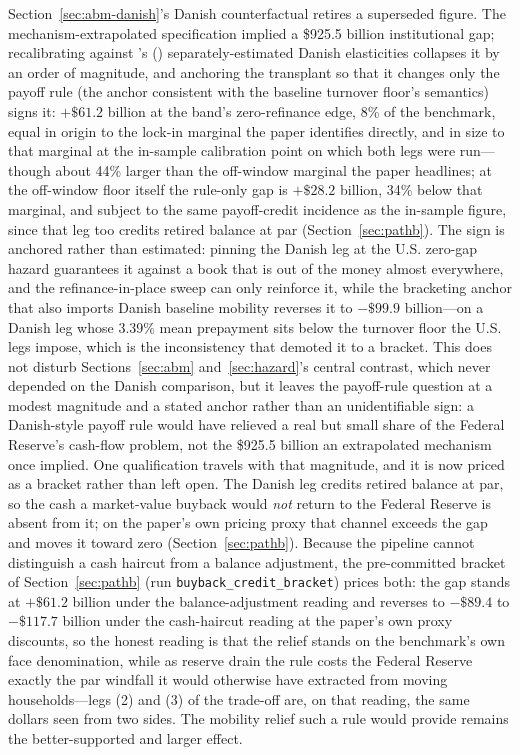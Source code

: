 \documentclass[12pt]{article}
\newcommand{\citepos}[1]{\citeauthor{#1}'s (\citeyear{#1})}
\begin{document}
Section~\ref{sec:abm-danish}'s Danish counterfactual retires a superseded figure. The mechanism-extrapolated specification implied a \$925.5 billion institutional gap; recalibrating against \citepos{berger2026} separately-estimated Danish elasticities collapses it by an order of magnitude, and anchoring the transplant so that it changes only the payoff rule (the anchor consistent with the baseline turnover floor's semantics) signs it: $+\$61.2$ billion at the band's zero-refinance edge, 8\% of the benchmark, equal in origin to the lock-in marginal the paper identifies directly, and in size to that marginal at the in-sample calibration point on which both legs were run---though about 44\% larger than the off-window marginal the paper headlines; at the off-window floor itself the rule-only gap is $+\$28.2$ billion, 34\% below that marginal, and subject to the same payoff-credit incidence as the in-sample figure, since that leg too credits retired balance at par (Section~\ref{sec:pathb}). The sign is anchored rather than estimated: pinning the Danish leg at the U.S. zero-gap hazard guarantees it against a book that is out of the money almost everywhere, and the refinance-in-place sweep can only reinforce it, while the bracketing anchor that also imports Danish baseline mobility reverses it to $-\$99.9$ billion---on a Danish leg whose 3.39\% mean prepayment sits below the turnover floor the U.S. legs impose, which is the inconsistency that demoted it to a bracket. This does not disturb Sections~\ref{sec:abm} and~\ref{sec:hazard}'s central contrast, which never depended on the Danish comparison, but it leaves the payoff-rule question at a modest magnitude and a stated anchor rather than an unidentifiable sign: a Danish-style payoff rule would have relieved a real but small share of the Federal Reserve's cash-flow problem, not the \$925.5 billion an extrapolated mechanism once implied. One qualification travels with that magnitude, and it is now priced as a bracket rather than left open. The Danish leg credits retired balance at par, so the cash a market-value buyback would \emph{not} return to the Federal Reserve is absent from it; on the paper's own pricing proxy that channel exceeds the gap and moves it toward zero (Section~\ref{sec:pathb}). Because the pipeline cannot distinguish a cash haircut from a balance adjustment, the pre-committed bracket of Section~\ref{sec:pathb} (run \texttt{buyback\_credit\_bracket}) prices both: the gap stands at $+\$61.2$ billion under the balance-adjustment reading and reverses to $-\$89.4$ to $-\$117.7$ billion under the cash-haircut reading at the paper's own proxy discounts, so the honest reading is that the relief stands on the benchmark's own face denomination, while as reserve drain the rule costs the Federal Reserve exactly the par windfall it would otherwise have extracted from moving households---legs (2) and (3) of the trade-off are, on that reading, the same dollars seen from two sides. The mobility relief such a rule would provide remains the better-supported and larger effect.
\end{document}
